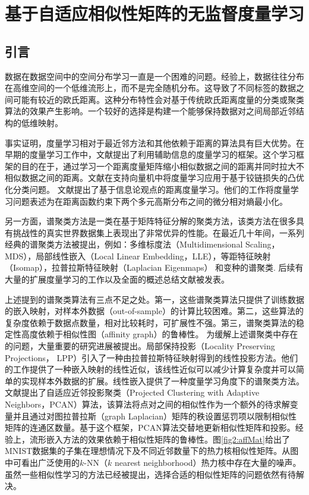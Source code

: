\chapter{基于自适应相似性矩阵的无监督度量学习}
\section{引言}
数据在数据空间中的空间分布学习一直是一个困难的问题。经验上，数据往往分布在高维空间的一个低维流形上，而不是完全随机分布。这导致了不同标签的数据之间可能有较近的欧氏距离。这种分布特性会对基于传统欧氏距离度量的分类或聚类算法的效果产生影响。一个较好的选择是构建一个能够保持数据对之间局部近邻结构的低维映射。

事实证明，度量学习相对于最近邻方法和其他依赖于距离的算法具有巨大优势。在早期的度量学习工作中，文献\parencite{xing2002distance}提出了利用辅助信息的度量学习的框架。这个学习框架的目的在于，通过学习一个距离度量矩阵缩小相似数据之间的距离并同时拉大不相似数据之间的距离。文献\parencite{weinberger2005distance}在支持向量机中将度量学习应用于基于铰链损失的凸优化分类问题。
文献\parencite{davis2007information}提出了基于信息论观点的距离度量学习。他们的工作将度量学习问题表述为在距离函数约束下两个多元高斯分布之间的微分相对熵最小化。

另一方面，谱聚类方法是一类在基于矩阵特征分解的聚类方法，该类方法在很多具有挑战性的真实世界数据集上表现出了非常优异的性能。在最近几十年间，一系列经典的谱聚类方法被提出，例如：多维标度法（Multidimensional Scaling，MDS）\cite{cox2000multidimensional}，局部线性嵌入（Local Linear Embedding，LLE）\cite{roweis2000nonlinear}，等距特征映射（Isomap）\cite{tenenbaum2000global}，拉普拉斯特征映射（Laplacian Eigenmaps）  \cite{belkin2001laplacian}和变种的谱聚类\cite{ng2002spectral}. 后续有大量的扩展度量学习的工作\cite{liu2015low,qian2015fine}以及全面的概述总结文献\cite{yang2006distance,kulis2012metric}被发表。

上述提到的谱聚类算法有三点不足之处。第一，这些谱聚类算法只提供了训练数据的嵌入映射，对样本外数据（out-of-sample）的计算比较困难。第二，这些算法的复杂度依赖于数据点数量，相对比较耗时，可扩展性不强。第三，谱聚类算法的稳定性高度依赖于相似性图（affinity graph）的鲁棒性。
为缓解上述谱聚类中存在的问题，大量重要的研究进展被提出\cite{bengio2004out,niyogi2004locality,fowlkes2004spectral,yan2009fast,chen2011large,pavan2007dominant,premachandran2013consensus,zhu2014constructing,nie2014clustering}。局部保持投影（Locality Preserving Projections， LPP）\cite{niyogi2004locality}引入了一种由拉普拉斯特征映射得到的线性投影方法。他们的工作提供了一种嵌入映射的线性近似，该线性近似可以减少计算复杂度并可以简单的实现样本外数据的扩展。线性嵌入提供了一种度量学习角度下的谱聚类方法。文献\parencite{nie2014clustering}提出了自适应近邻投影聚类（Projected Clustering with Adaptive Neighbors，PCAN）算法，该算法将点对之间的相似性作为一个额外的待求解变量并且通过对图拉普拉斯（graph Laplacian）矩阵的秩设置惩罚项以限制相似性矩阵的连通区数量。基于这个框架，PCAN算法交替地更新相似性矩阵和投影。经验上，流形嵌入方法的效果依赖于相似性矩阵的鲁棒性。图\ref{fig2:affMat}给出了MNIST数据集\cite{lecun1998gradient}的子集在理想情况下及不同近邻数量下的热力核相似性矩阵。从图中可看出广泛使用的$k$-NN（$k$ nearest neighborhood）热力核中存在大量的噪声。虽然一些相似性学习的方法已经被提出，选择合适的相似性矩阵的问题依然有待解决。

